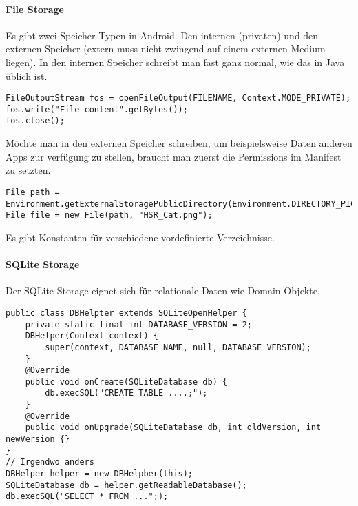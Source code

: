 \paragraph{File Storage} Es gibt zwei Speicher-Typen in Android. Den internen (privaten) und den externen Speicher (extern muss nicht zwingend auf einem externen Medium liegen). In den internen Speicher schreibt man fast ganz normal, wie das in Java üblich ist.
\begin{lstlisting}
FileOutputStream fos = openFileOutput(FILENAME, Context.MODE_PRIVATE);
fos.write("File content".getBytes());
fos.close();
\end{lstlisting}
Möchte man in den externen Speicher schreiben, um beispielsweise Daten anderen Apps zur verfügung zu stellen, braucht man zuerst die Permissions im Manifest zu setzten. 
\begin{lstlisting}
File path = Environment.getExternalStoragePublicDirectory(Environment.DIRECTORY_PICTURES);
File file = new File(path, "HSR_Cat.png");
\end{lstlisting}
Es gibt Konstanten für verschiedene vordefinierte Verzeichnisse.
\paragraph{SQLite Storage} Der SQLite Storage eignet sich für relationale Daten wie Domain Objekte.
\begin{lstlisting}
public class DBHelpter extends SQLiteOpenHelper {
    private static final int DATABASE_VERSION = 2;
    DBHelper(Context context) {
        super(context, DATABASE_NAME, null, DATABASE_VERSION);
    }
    @Override
    public void onCreate(SQLiteDatabase db) {
        db.execSQL("CREATE TABLE ....;");
    }
    @Override
    public void onUpgrade(SQLiteDatabase db, int oldVersion, int newVersion {}
}
// Irgendwo anders
DBHelper helper = new DBHelpber(this);
SQLiteDatabase db = helper.getReadableDatabase();
db.execSQL("SELECT * FROM ...";);
\end{lstlisting}
